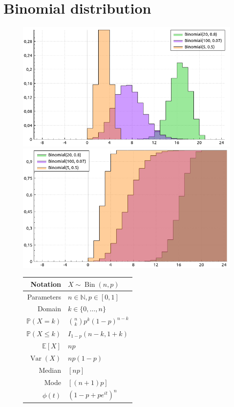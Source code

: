 \documentclass[a4paper,11pt]{article}
\theoremstyle{plain}
\theoremstyle{definition}
\newcommand{\ME}{\mathbb{E}}
\newcommand{\MP}{\mathbb{P}}
\newcommand{\MN}{\mathbb{N}}
\newcommand{\Var}{\operatorname{Var}}
\begin{document}
	\section{Binomial distribution}
	\begin{figure}[!htb]\centering
		\begin{minipage}{0.55\textwidth}
			\includegraphics[width=\linewidth, right]{binomial_pmf}
			\captionsetup{labelformat=empty}
			\includegraphics[width=\linewidth, right]{binomial_cdf}
			\captionsetup{labelformat=empty}
		\end{minipage}
		\begin{minipage}{0.4\textwidth}
			\begin{tabular}{| r | l |}
			\hline
			Notation & $ X \sim \operatorname{Bin}(n, p) $ \\
			\hline
			Parameters & $ n \in \MN, p \in [0, 1]  $ \\
			\hline
			Domain & $ k \in \{0, \dots, n  \} $  \\
			\hline
			$\MP(X = k)$ & $\binom{n}{k} p^k (1-p)^{n-k}  $ \\
			\hline
			$\MP(X \leq k)$ & $I_{1-p}(n-k, 1+k) $ \\
			\hline
			$\ME[X]$ & $ np$ \\
			\hline
			$\Var(X)$ & $np(1-p)$ \\
			\hline
			Median & $[np]$ \\
			\hline
			Mode & $[(n+1)p]$ \\
			\hline
			$\phi(t)$ & $ (1-p+pe^{it})^n  $ \\
			\hline
		\end{tabular}
		\end{minipage}
	\end{figure}
	
\end{document}
